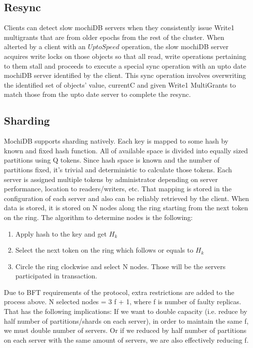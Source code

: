 \documentclass[letterpaper,twocolumn,10pt]{article}
\begin{document}
\subsection{Resync}
Clients can detect slow mochiDB servers when they consistently issue Write1 multigrants that are from older epochs from the rest of the cluster. When alterted by a client with an $UptoSpeed$ operation, the slow mochiDB server acquires write locks on those objects so that all read, write operations pertaining to them stall and proceeds to execute a special sync operation with an upto date mochiDB server identified by the client. This sync operation involves overwriting the identified set of objects' value, currentC and given Write1 MultiGrants to match those from the upto date server to complete the resync.

\subsection{Sharding}
MochiDB supports sharding natively. Each key is mapped to some hash by known and fixed hash function. All of available space is divided into equally sized partitions using Q tokens. Since hash space is known and the number of partitions fixed, it’s trivial and deterministic to calculate those tokens.
Each server is assigned multiple tokens by administrator depending on server performance, location to readers/writers, etc. That mapping is stored in the configuration of each server and also can be reliably retrieved by the client. When data is stored, it is stored on N nodes along the ring starting from the next token on the ring. The algorithm to determine nodes is the following:
\begin{enumerate}[noitemsep, topsep=0pt,]
  \item Apply hash to the key and get $H_{k}$
  \item Select the next token on the ring which follows or equals to $H_{k}$
  \item Circle the ring clockwise and select N nodes. Those will be the servers participated in transaction.
\end{enumerate}

Due to BFT requirements of the protocol, extra restrictions are added to the process above. N selected nodes = 3 f + 1, where f is number of faulty replicas. That has the following implications: If we want to double capacity (i.e. reduce by half number of partitions/shards on each server), in order to maintain the same f, we must double number of servers. Or if we reduced by half number of partitions on each server with the same amount of servers, we are also effectively reducing f.
\end{document}
